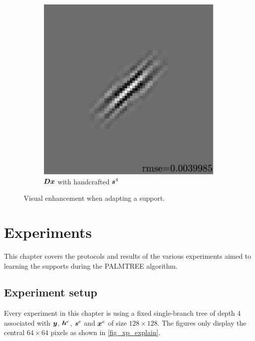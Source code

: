 \begin{figure}[!ht]
\begin{subfigure}[b]{0.085\textwidth}
	\caption{}
\end{subfigure}
\begin{subfigure}[b]{0.39\textwidth}\centering
	\includegraphics[width=\textwidth]{figures/exple-better-support/xp_128x128_sc2_angl1_K3_S3_node4expected_approx.pdf}
	\caption{$\bm{D}\bm{x}$ with handcrafted $\bm{s}^4$}\label{fig_xp_fixed_vs_expected_approx2}
\end{subfigure}
\caption{Visual enhancement when adapting a support.} \label{fig_xp_fixed_vs_expected}
\end{figure}




\chapter{Experiments}

This chapter covers the protocols and results of the various experiments aimed to learning the supports during the \ac{PALMTREE} algorithm.

\section{Experiment setup}
Every experiment in this chapter is using a fixed single-branch tree of depth 4 associated with $\bm{y}$, $\bm{h}^e$, $\bm{s}^e$ and $\bm{x}^e$ of size $128 \times 128$. The figures only display the central $64 \times 64$ pixels as shown in \cref{fig_xp_explain}.

